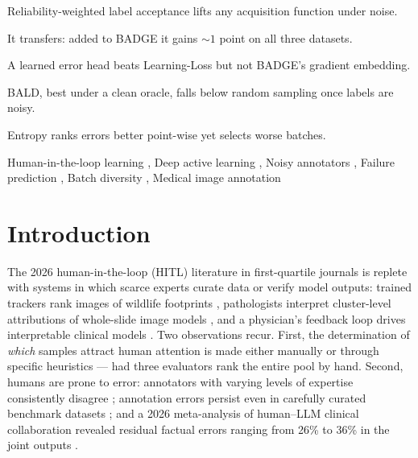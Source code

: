 \documentclass[a4paper,fleqn,longmktitle]{cas-sc}
\begin{document}
\begin{highlights}
\item Reliability-weighted label acceptance lifts any acquisition function under noise.
\item It transfers: added to BADGE it gains ${\sim}1$ point on all three datasets.
\item A learned error head beats Learning-Loss but not BADGE's gradient embedding.
\item BALD, best under a clean oracle, falls below random sampling once labels are noisy.
\item Entropy ranks errors better point-wise yet selects worse batches.
\end{highlights}

\begin{keywords}
Human-in-the-loop learning \sep
Deep active learning \sep
Noisy annotators \sep
Failure prediction \sep
Batch diversity \sep
Medical image annotation
\end{keywords}

\maketitle

\section{Introduction}\label{sec:intro}
The 2026 human-in-the-loop (HITL) literature in first-quartile journals
is replete with systems in which scarce experts curate data or verify
model outputs: trained trackers rank images of wildlife footprints
\citep{petso2026}, pathologists interpret cluster-level attributions of
whole-slide image models \citep{lou2026}, and a physician's feedback
loop drives interpretable clinical models \citep{feng2026}. Two
observations recur. First, the determination of \emph{which} samples
attract human attention is made either manually or through specific
heuristics --- \citet{petso2026} had three evaluators rank the entire
pool by hand. Second, humans are prone to error: annotators with
varying levels of expertise consistently disagree \citep{petso2026};
annotation errors persist even in carefully curated benchmark datasets
\citep{hussain2026}; and a 2026 meta-analysis of human--LLM clinical
collaboration revealed residual factual errors ranging from 26\% to
36\% in the joint outputs \citep{wang2026}.
\end{document}
